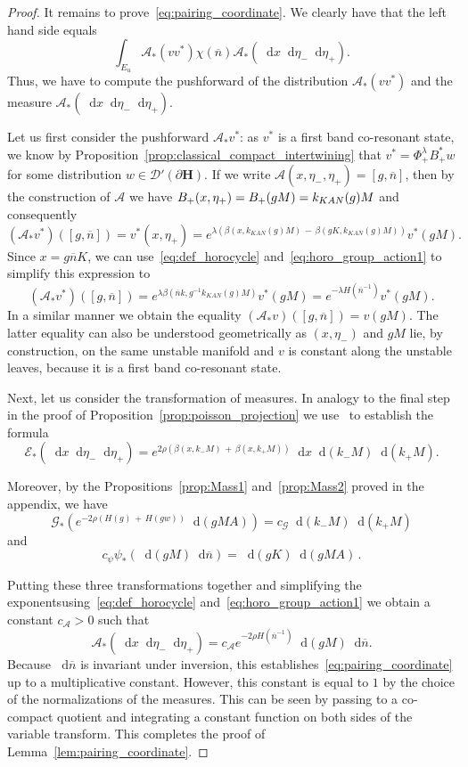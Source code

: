 \documentclass[10pt]{amsart}
\theoremstyle{definition}
\newcommand{\mc}{\mathcal}
\newcommand{\intd}{\mathop{}\!\mathrm{d}}
\newcommand{\bn}{{\overline{n}}}
\newcommand{\bhspc}{\partial \mathbf{H}}
\begin{document}
\begin{proof}
It remains to prove~\eqref{eq:pairing_coordinate}. We clearly have that the left hand side equals
\[
\int_{E_u} \mc{A}_*(vv^*) \chi(\bn)\mathcal A_*(\intd x\intd \eta_-\intd \eta_+).
\]
Thus, we have to compute the pushforward of the distribution $\mc{A}_*(v v^*)$ and the measure $\mc{A}_*(\intd x\intd \eta_-\intd \eta_+)$.

Let us first consider the pushforward $\mathcal A_*v^*$: as $v^*$ is a first band co-resonant state, we know by Proposition~\ref{prop:classical_compact_intertwining} that $v^*=\Phi_+^\lambda B_+^*w$ for some distribution $w\in \mathcal D'(\bhspc)$. If we write $\mathcal A(x,\eta_-,\eta_+)=[g,\bn]$, then by the construction of $\mathcal A$ we have $B_+(x,\eta_+)\linebreak= B_+(gM)=k_{KAN}(g)M$ and consequently
\[
(\mathcal A_*v^*)([g,\bn]) = v^*(x,\eta_+) = e^{\lambda(\beta(x, k_{KAN}(g)M)\,-\,\beta(gK, k_{KAN}(g)M))} v^*(gM).
\]
Since $x=g\bn K$, we can use~\eqref{eq:def_horocycle} and~\eqref{eq:horo_group_action1} to simplify this expression to
\[
(\mathcal A_*v^*)([g,\bn]) = e^{\lambda\beta(\bn k, g^{-1}k_{KAN}(g)M)} v^*(gM)= e^{-\lambda H(\bn^{-1})} v^*(gM).
\]
In a similar manner we obtain the equality $(\mathcal A_*v)([g,\bn]) = v(gM)$. The latter equality can also be understood geometrically as $(x,\eta_-)$ and $gM$ lie, by construction, on the same unstable manifold and $v$ is constant along the unstable leaves, because it is a first band co-resonant state.

Next, let us consider the transformation of measures. In analogy to the final step in the proof of Proposition~\ref{prop:poisson_projection} we use~\cite[Lemma~I.5.19]{Hel84} to establish the formula
\[
\mathcal E_*(\intd x\intd \eta_-\intd \eta_+) = e^{2\rho(\beta(x,k_-M)\,+\,\beta(x,k_+M))}\intd x\intd (k_-M)\intd (k_+M).
\]

Moreover, by the Propositions~\ref{prop:Mass1} and~\ref{prop:Mass2} proved in the appendix, we have
\[
\mathcal G_*\left(e^{-2\rho(H(g)\,+\,H(gw))}\intd (gMA)\right) = c_{\mathcal G}\intd (k_-M) \intd (k_+M)
\]
and
\[
c_\psi \psi_*(\intd (gM)\intd \bn) = \intd (gK)\intd (gMA)\,.
\]


Putting these three transformations together and simplifying the exponents\linebreak using~\eqref{eq:def_horocycle} and~\eqref{eq:horo_group_action1} we obtain a constant $c_{\mathcal A}>0$ such that
\begin{equation}\label{eq:push_forward_measure}
\mathcal A_*(\intd x\intd \eta_-\intd \eta_+)= c_{\mathcal A} e^{-2\rho H(\bn^{-1})} \intd (gM)\intd \bn.
\end{equation}
Because $\intd\bn$ is invariant under inversion, this establishes~\eqref{eq:pairing_coordinate} up to a multiplicative constant. However, this constant is equal to $1$ by the choice of the normalizations of the measures. This can be seen by passing to a co-compact quotient and integrating a constant function on both sides of the variable transform. This completes the proof of Lemma~\ref{lem:pairing_coordinate}.
\end{proof}
\end{document}
